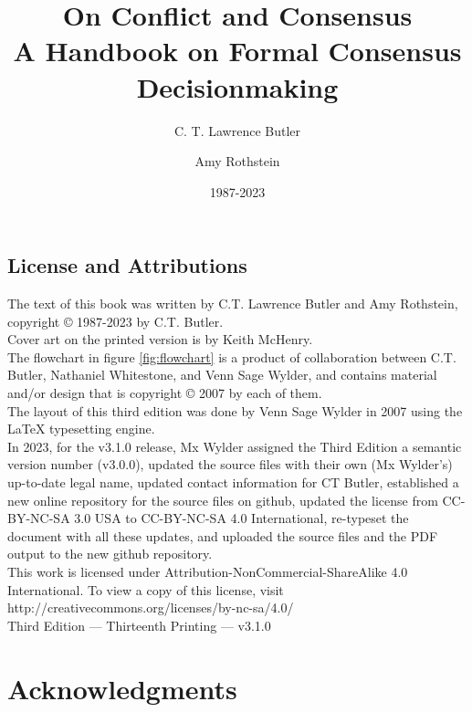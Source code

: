\documentclass[12pt,nottoc]{book}
\author{C. T. Lawrence Butler \and Amy Rothstein}
\title{On Conflict and Consensus\\ \large A Handbook on Formal
  Consensus Decisionmaking}
\date{1987-2023}
\begin{document}
\frontmatter
\pagestyle{empty}
\maketitle

{\footnotesize
\section*{License and Attributions}
\noindent{}The text of this book was written by C.T. Lawrence Butler and Amy
Rothstein, copyright \copyright{} 1987-2023 by C.T. Butler.\\

\noindent{}Cover art on the printed version is by Keith McHenry.\\

\noindent{}The flowchart in figure \ref{fig:flowchart} is a product of collaboration between C.T. Butler, Nathaniel Whitestone, and Venn Sage Wylder, and contains material and/or design that is copyright \copyright{} 2007 by each of them.\\

\noindent{}The layout of this third edition was done by Venn Sage Wylder in 2007 using the \LaTeX{} typesetting engine.\\

\noindent{}In 2023, for the v3.1.0 release, Mx Wylder assigned the Third Edition a semantic version number (v3.0.0), updated the source files with their own (Mx Wylder's) up-to-date legal name, updated contact information for CT Butler, established a new online repository for the source files on github, updated the license from CC-BY-NC-SA 3.0 USA to CC-BY-NC-SA 4.0 International, re-typeset the document with all these updates, and uploaded the source files and the PDF output to the new github repository.\\

\noindent{}This work is licensed under Attribution-NonCommercial-ShareAlike 4.0 International. To view a copy of this license, visit http://creativecommons.org/licenses/by-nc-sa/4.0/\\

\noindent{}Third Edition --- Thirteenth Printing --- v3.1.0\\

}


\chapter*{Acknowledgments}
{\footnotesize


}
\end{document}
